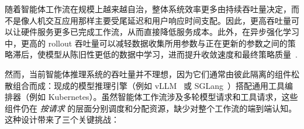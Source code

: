 
随着智能体工作流在规模上越来越自治，整体系统效率更多由持续吞吐量决定，而不是像人机交互应用那样主要受尾延迟和用户响应时间支配。因此，更高吞吐量可以让硬件服务更多已完成工作流，从而直接降低服务成本。此外，在异步强化学习中，更高的 rollout 吞吐量可以减轻数据收集所用参数与正在更新的参数之间的策略滞后，使模型从陈旧性更低的数据中学习，进而提升收敛速度和最终策略质量~\citep{fu2025areallargescaleasynchronousreinforcement, Sheng_2025, shenfeld2025rlsrazoronlinereinforcement,zheng2025stabilizingreinforcementlearningllms}.



然而，当前智能体推理系统的吞吐量并不理想，因为它们通常由彼此隔离的组件松散组合而成：现成的模型推理引擎（例如 vLLM~\citep{kwon2023efficientmemorymanagementlarge} 或 SGLang~\citep{zheng2024sglangefficientexecutionstructured}）搭配通用工具编排器（例如 Kubernetes）。虽然智能体工作流涉及多轮模型请求和工具请求，这些组件仍在 \textit{按请求} 的层面分别调度和分配资源，缺少对整个工作流的端到端认知。这种设计带来了三个关键挑战：

